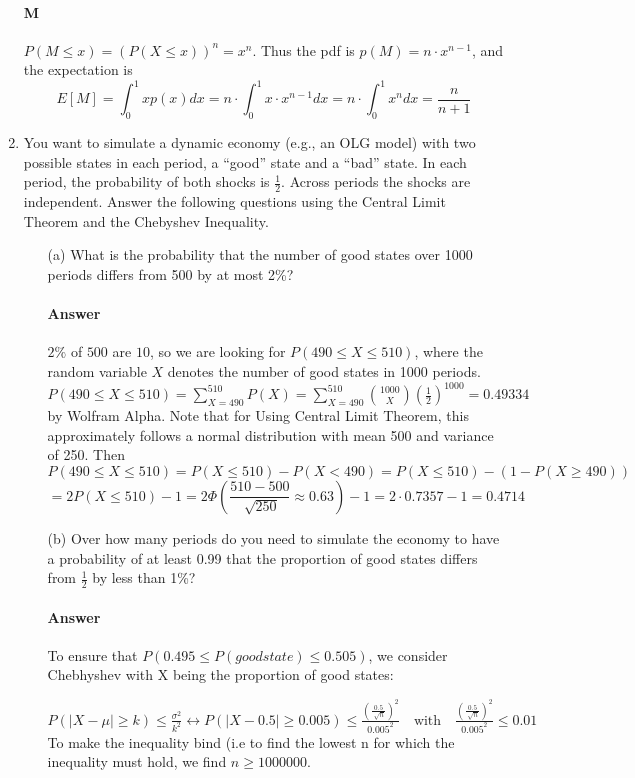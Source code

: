 \documentclass[letterpaper,12pt]{article}
\theoremstyle{definition}
\begin{document}
\begin{enumerate}
    \paragraph{M} $P( M \le x) = (P(X \le x))^n= x^n$.
    Thus the pdf is $p(M) = n\cdot x^{n - 1}$, and the expectation is
    $$E[M] = \int_0^1 x p(x) dx = n \cdot \int_0^1 x \cdot x^{n - 1} dx = n \cdot \int_0^1 x^{n} dx = \frac{n}{n + 1} $$

	\item You want to simulate a dynamic economy (e.g., an OLG model) with two possible states in each period, a ``good'' state and a ``bad'' state. In each period, the probability of both shocks is $\frac{1}{2}$. Across periods the shocks are independent. Answer the following questions using the Central Limit Theorem and the Chebyshev Inequality.
		\begin{itemize}
			\item[(a)] What is the probability that the number of good states over 1000 periods differs from 500 by at most 2\%?
            \paragraph{Answer} $2\%$ of $500$ are $10$, so we are looking for $P(490 \leq X \leq 510)$, where the random variable $X$ denotes the number of good states in 1000 periods.
            $P(490 \leq X \leq 510) = \sum_{X=490}^{510}P(X) = \sum_{X=490}^{510} \binom{1000}{X} (\frac{1}{2})^{1000} = 0.49334$ by Wolfram Alpha.
            Note that for 
            Using Central Limit Theorem, this approximately follows a normal distribution with mean 500 and variance of  250. 
            Then $$P(490 \leq X \leq 510) = P(X \leq 510) - P(X < 490) = P(X \leq 510) - (1 - P(X \geq 490))$$ 
            $$= 2 P(X \leq 510) - 1 = 2\Phi(\frac{510-500}{\sqrt[]{250}} \approx 0.63) - 1 = 2 \cdot 0.7357 - 1 = 0.4714$$
           
            
			\item[(b)] Over how many periods do you need to simulate the economy to have a probability of at least 0.99 that the proportion of good states differs from $\frac{1}{2}$ by less than 1\%?
           \paragraph{Answer} To ensure that $P(0.495 \leq P(good state) \leq 0.505 )$, we consider Chebhyshev with X being the proportion of good states: 
           
           $P(\vert X - \mu \vert \ge k ) \le \frac{\sigma^2}{k^2} \leftrightarrow P(\vert X - 0.5 \vert \ge 0.005) \le \frac{(\frac{0.5}{\sqrt[]{n}})^2}{0.005^2} \quad\text{with} \quad \frac{(\frac{0.5}{\sqrt[]{n}})^2}{0.005^2} \le 0.01$
           To make the inequality bind (i.e to find the lowest n for which the inequality must hold, we find $n \ge 1000000$.
           

\end{itemize}
\end{enumerate}
\end{document}
